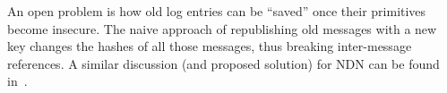 \documentclass[10pt,sigconf,rewiew]{acmart}
\begin{document}
An open problem is how old log entries can be ``saved'' once their primitives become insecure. The naive approach of republishing old messages with a new key changes the hashes of all those messages, thus breaking inter-message references.
A similar discussion (and proposed solution) for NDN can be found in~\cite{DeLorean}.
%
%

%
%



\end{document}
